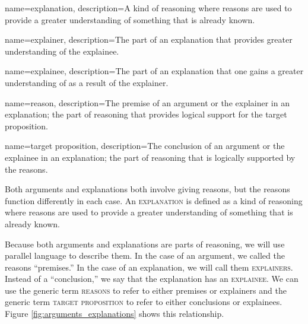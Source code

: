 {
{
name=explanation,
description={A kind of reasoning where reasons are used to provide a greater understanding of something that is already known.}
}

{
name=explainer,
description={The part of an explanation that provides greater understanding of the explainee.}
}

{
name=explainee,
description={The part of an explanation that one gains a greater understanding of as a result of the explainer.}
}

{
name=reason,
description={The premise of an argument or the explainer in an explanation; the part of reasoning that provides logical support for the target proposition.}
}

{
name=target proposition,
description={The conclusion of an argument or the explainee in an explanation; the part of reasoning that is logically supported by the reasons.}
}



Both arguments and explanations both involve giving reasons, but the reasons function differently in each case. An \textsc{\gls{explanation}} \label{def:explanation}is defined as a kind of reasoning where reasons are used to provide a greater understanding of something that is already known.  

Because both arguments and explanations are parts of reasoning, we will use parallel language to describe them. In the case of an argument, we called the reasons ``premises.'' In the case of an explanation, we will call them \textsc{\glspl{explainer}}. \label{def:explainer} Instead of a ``conclusion,'' we say that the explanation has an \textsc{\gls{explainee}}.  \label{def:explainee} We can use the generic term \textsc{\glspl{reason}} \label{def:reason} to refer to either premises or explainers and the generic term \textsc{\gls{target proposition}} \label{def:target_proposition} to refer to either conclusions or explainees. Figure \ref{fig:arguments_explanations} shows this relationship. 


\begin{figure}
\begin{mdframed}[style=mytableclearbox, userdefinedwidth=.65\textwidth]
\end{mdframed}
\end{figure}}
